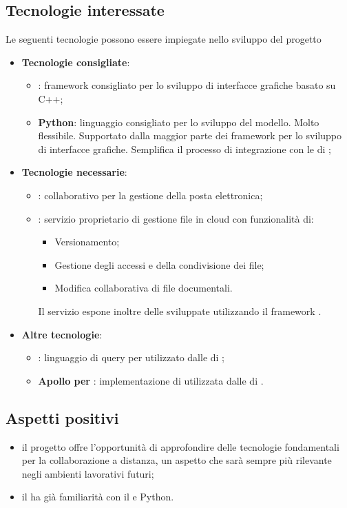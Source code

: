 \subsection{Tecnologie interessate}
Le seguenti tecnologie possono essere impiegate nello sviluppo del progetto
\begin{itemize}
\item \textbf{Tecnologie consigliate}:
\begin{itemize}
    \item \textbf{}: framework consigliato per lo sviluppo di interfacce grafiche basato su C++;
    \item \textbf{Python}: linguaggio consigliato per lo sviluppo del modello. Molto flessibile. Supportato dalla maggior parte dei framework per lo sviluppo di interfacce grafiche. 
    Semplifica il processo di integrazione con le  di ;
    \end{itemize}
\newpage
\item \textbf{Tecnologie necessarie}:
    \begin{itemize}
    \item \textbf{}:  collaborativo per la gestione della posta elettronica;
    \item \textbf{}: servizio proprietario di gestione file in cloud con funzionalità di:
        \begin{itemize}
        \item Versionamento;
        \item Gestione degli accessi e della condivisione dei file;
        \item Modifica collaborativa di file documentali.
        \end{itemize}
    Il servizio espone inoltre delle  sviluppate utilizzando il framework .
\end{itemize}
\item \textbf{Altre tecnologie}:
    \begin{itemize}
    \item \textbf{}: linguaggio di query per  utilizzato dalle  di ;
    \item \textbf{Apollo per }: implementazione di  utilizzata dalle  di .
    \end{itemize}
\end{itemize}

\subsection{Aspetti positivi}
\begin{itemize}
\item il progetto offre l'opportunità di approfondire delle tecnologie fondamentali per la collaborazione a distanza, un aspetto che sarà sempre più rilevante negli ambienti lavorativi futuri;
\item il  ha già familiarità con il  e Python.
\end{itemize}

